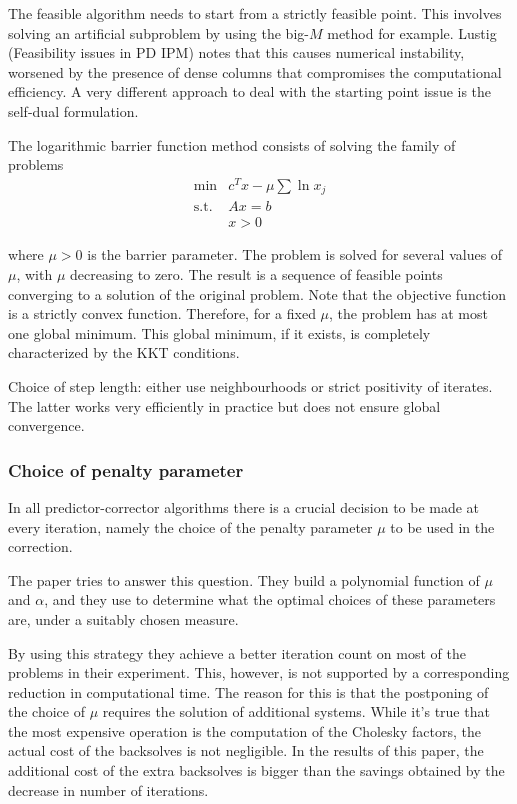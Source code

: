 The feasible algorithm needs to start from a strictly feasible 
point. This involves solving an artificial subproblem by using 
the big-$M$ method for example. Lustig (Feasibility issues in 
PD IPM) notes that this causes numerical instability, worsened 
by the presence of dense columns that compromises the 
computational efficiency. A very different approach to deal 
with the starting point issue is the self-dual formulation.

\hrulefill

The logarithmic barrier function method consists of solving the 
family of problems
\begin{eqnarray*}
   \min & c^Tx - \mu \sum \ln x_j \\
   \mbox{s.t.} & Ax = b \\
               & x>0
\end{eqnarray*}

where $\mu>0$ is the barrier parameter. The problem is solved 
for several values of $\mu$, with $\mu$ decreasing to zero. 
The result is a sequence of feasible points converging to a 
solution of the original problem. Note that the objective 
function is a strictly convex function. Therefore, for a 
fixed $\mu$, the problem has at most one global minimum. 
This global minimum, if it exists, is completely characterized 
by the KKT conditions.

\hrulefill

Choice of step length: either use neighbourhoods or strict 
positivity of iterates. The latter works very efficiently 
in practice but does not ensure global convergence.


%
%
\subsubsection{Choice of penalty parameter}

In all predictor-corrector algorithms there is a crucial decision 
to be made at every iteration, namely the choice of the penalty 
parameter $\mu$ to be used in the correction.

The paper \cite{VillasBoasPerin} tries to answer this question. 
They build a polynomial function of $\mu$ and $\alpha$, and they 
use to determine what the optimal choices of these parameters are, 
under a suitably chosen measure.

By using this strategy they achieve a better iteration count on 
most of the problems in their experiment. This, however, is not 
supported by a corresponding reduction in computational time. 
The reason for this is that the postponing of the choice of $\mu$ 
requires the solution of additional systems. While it's true that 
the most expensive operation is the computation of the Cholesky 
factors, the actual cost of the backsolves is not negligible. 
In the results of this paper, the additional cost of the extra 
backsolves is bigger than the savings obtained by the decrease 
in number of iterations.

